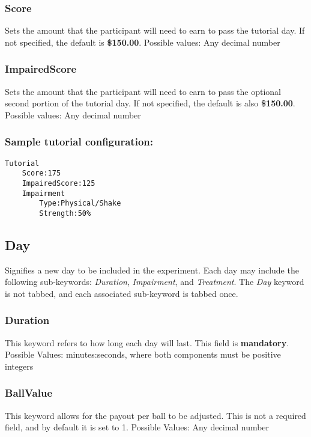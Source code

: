 \documentclass{article}
\begin{document}
\subsubsection*{Score} Sets the amount that the participant will need to earn to pass the tutorial day. If not specified, the default is \textbf{\$150.00}. \newline
\indent Possible values: \newline
\indent\indent Any decimal number

\subsubsection*{ImpairedScore} Sets the amount that the participant will need to earn to pass the optional second portion of the tutorial day. If not specified, the default is also \textbf{\$150.00}. \newline
\indent Possible values: \newline
\indent\indent Any decimal number

\subsubsection*{Sample tutorial configuration:}
\begin{lstlisting}
Tutorial
    Score:175
    ImpairedScore:125
    Impairment
        Type:Physical/Shake
        Strength:50%
\end{lstlisting}

\pagebreak\subsection*{Day}
Signifies a new day to be included in the experiment. Each day may include the following sub-keywords: \textit{Duration}, \textit{Impairment}, and \textit{Treatment}. The \textit{Day} keyword is not tabbed, and each associated sub-keyword is tabbed once.

\subsubsection*{Duration}
This keyword refers to how long each day will last. This field is \textbf{mandatory}. \newline
\indent Possible Values: \newline
\indent\indent minutes:seconds, where both components must be positive integers

\subsubsection*{BallValue}
This keyword allows for the payout per ball to be adjusted. This is not a required field, and by default it is set to 1. \newline
\indent Possible Values: \newline
\indent\indent Any decimal number
\end{document}
